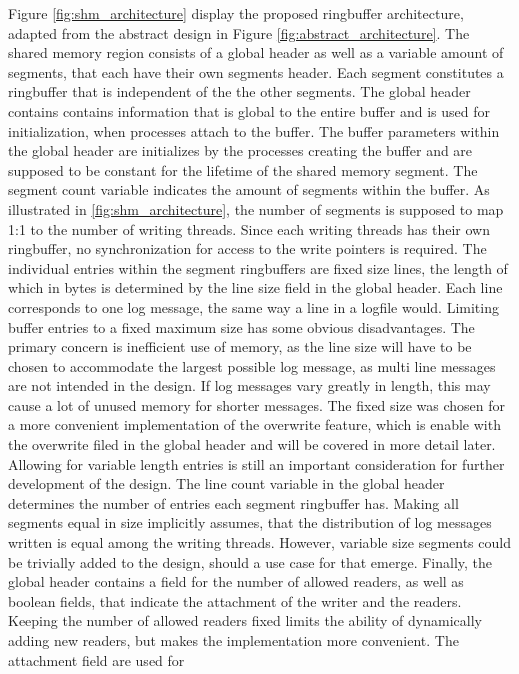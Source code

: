 Figure \ref{fig:shm_architecture} display the proposed ringbuffer architecture, adapted from the abstract design in Figure \ref{fig:abstract_architecture}.
The shared memory region consists of a global header as well as a variable amount of segments,
that each have their own segments header. Each segment constitutes a ringbuffer that is independent of the
the other segments. The global header contains contains information that is global to
the entire buffer and is used for initialization, when processes attach to the buffer. The buffer parameters within the global
header are initializes by the processes creating the buffer and are supposed to be constant for the lifetime of the shared memory segment.
The segment count variable indicates the amount of segments within the buffer. As illustrated
in \ref{fig:shm_architecture}, the number of segments is supposed to map 1:1 to the number 
of writing threads. Since each writing threads has their own ringbuffer, no synchronization for access
to the write pointers is required. The individual entries within the segment ringbuffers are fixed
size lines, the length of which in bytes is determined by the line size field in the global header. Each line corresponds
to one log message, the same way a line in a logfile would.  
Limiting buffer entries to a fixed maximum size has some obvious disadvantages. The primary concern
is inefficient use of memory, as the line size will have to be chosen to accommodate the largest possible log message, as multi line
messages are not intended in the design. If log messages vary greatly in length, this may cause a lot of unused memory
for shorter messages. The fixed size was chosen for a more convenient implementation of the overwrite feature, which is enable with the overwrite filed in the global header and will be covered in more detail
later. Allowing for variable length entries is still an important consideration for further development of the design. The line count variable in the global header 
determines the number of entries each segment ringbuffer has. Making all segments equal in size implicitly assumes, that the distribution of log messages written
is equal among the writing threads. However, variable size segments could be trivially added to the design, should a use case for that emerge. 
Finally, the global header contains a field for the number of allowed readers, as well as boolean fields, that indicate the attachment of the writer and the readers.
Keeping the number of allowed readers fixed limits the ability of dynamically adding new readers, but makes the implementation more convenient. The attachment field are used for
